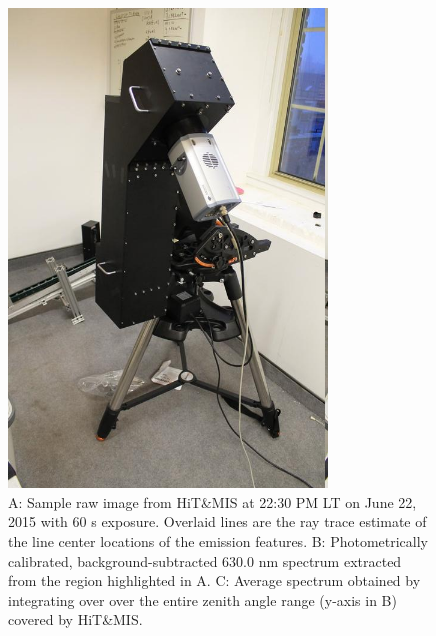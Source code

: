 \begin{figure}[hp]
	\centering\includegraphics[width=20pc]{Hitmis_tripod_mount.JPG}
	\caption{A: Sample raw image from HiT\&MIS at 22:30 PM LT on June 22, 2015 with 60 s exposure. Overlaid lines are the ray trace estimate of the line center locations of the emission features. B: Photometrically calibrated, background-subtracted 630.0 nm spectrum extracted from the region highlighted in A. C: Average spectrum obtained by integrating over 
		over the entire zenith angle range (y-axis in B) covered by HiT\&MIS.}
	\label{fig:raw}
\end{figure}
